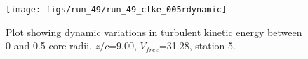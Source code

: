 \begin{figure}[H]
\centering
\texttt{[image: figs/run\_49/run\_49\_ctke\_005rdynamic]}
\caption{Plot showing dynamic variations in turbulent kinetic energy between 0 and 0.5 core radii. $z/c$=9.00, $V_{free}$=31.28, station 5.}
\label{fig:run_49_ctke_005rdynamic}
\end{figure}


